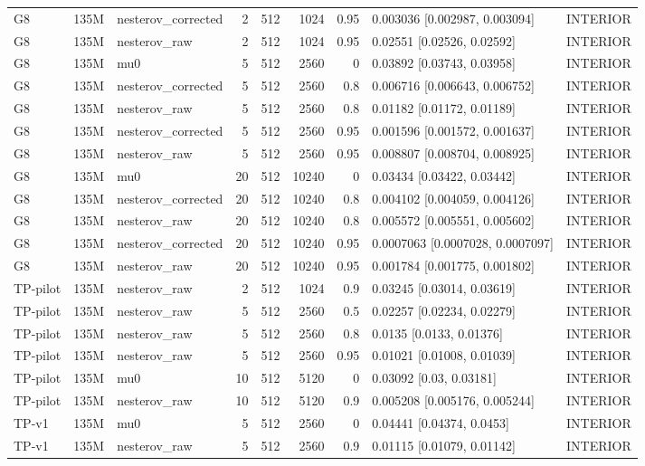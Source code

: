\begin{longtable}{lllrrrrll}
G8 & 135M & nesterov\_corrected & 2 & 512 & 1024 & 0.95 & 0.003036 [0.002987, 0.003094] & INTERIOR \\
G8 & 135M & nesterov\_raw & 2 & 512 & 1024 & 0.95 & 0.02551 [0.02526, 0.02592] & INTERIOR \\
G8 & 135M & mu0 & 5 & 512 & 2560 & 0 & 0.03892 [0.03743, 0.03958] & INTERIOR \\
G8 & 135M & nesterov\_corrected & 5 & 512 & 2560 & 0.8 & 0.006716 [0.006643, 0.006752] & INTERIOR \\
G8 & 135M & nesterov\_raw & 5 & 512 & 2560 & 0.8 & 0.01182 [0.01172, 0.01189] & INTERIOR \\
G8 & 135M & nesterov\_corrected & 5 & 512 & 2560 & 0.95 & 0.001596 [0.001572, 0.001637] & INTERIOR \\
G8 & 135M & nesterov\_raw & 5 & 512 & 2560 & 0.95 & 0.008807 [0.008704, 0.008925] & INTERIOR \\
G8 & 135M & mu0 & 20 & 512 & 10240 & 0 & 0.03434 [0.03422, 0.03442] & INTERIOR \\
G8 & 135M & nesterov\_corrected & 20 & 512 & 10240 & 0.8 & 0.004102 [0.004059, 0.004126] & INTERIOR \\
G8 & 135M & nesterov\_raw & 20 & 512 & 10240 & 0.8 & 0.005572 [0.005551, 0.005602] & INTERIOR \\
G8 & 135M & nesterov\_corrected & 20 & 512 & 10240 & 0.95 & 0.0007063 [0.0007028, 0.0007097] & INTERIOR \\
G8 & 135M & nesterov\_raw & 20 & 512 & 10240 & 0.95 & 0.001784 [0.001775, 0.001802] & INTERIOR \\
TP-pilot & 135M & nesterov\_raw & 2 & 512 & 1024 & 0.9 & 0.03245 [0.03014, 0.03619] & INTERIOR \\
TP-pilot & 135M & nesterov\_raw & 5 & 512 & 2560 & 0.5 & 0.02257 [0.02234, 0.02279] & INTERIOR \\
TP-pilot & 135M & nesterov\_raw & 5 & 512 & 2560 & 0.8 & 0.0135 [0.0133, 0.01376] & INTERIOR \\
TP-pilot & 135M & nesterov\_raw & 5 & 512 & 2560 & 0.95 & 0.01021 [0.01008, 0.01039] & INTERIOR \\
TP-pilot & 135M & mu0 & 10 & 512 & 5120 & 0 & 0.03092 [0.03, 0.03181] & INTERIOR \\
TP-pilot & 135M & nesterov\_raw & 10 & 512 & 5120 & 0.9 & 0.005208 [0.005176, 0.005244] & INTERIOR \\
TP-v1 & 135M & mu0 & 5 & 512 & 2560 & 0 & 0.04441 [0.04374, 0.0453] & INTERIOR \\
TP-v1 & 135M & nesterov\_raw & 5 & 512 & 2560 & 0.9 & 0.01115 [0.01079, 0.01142] & INTERIOR \\

\end{longtable}
